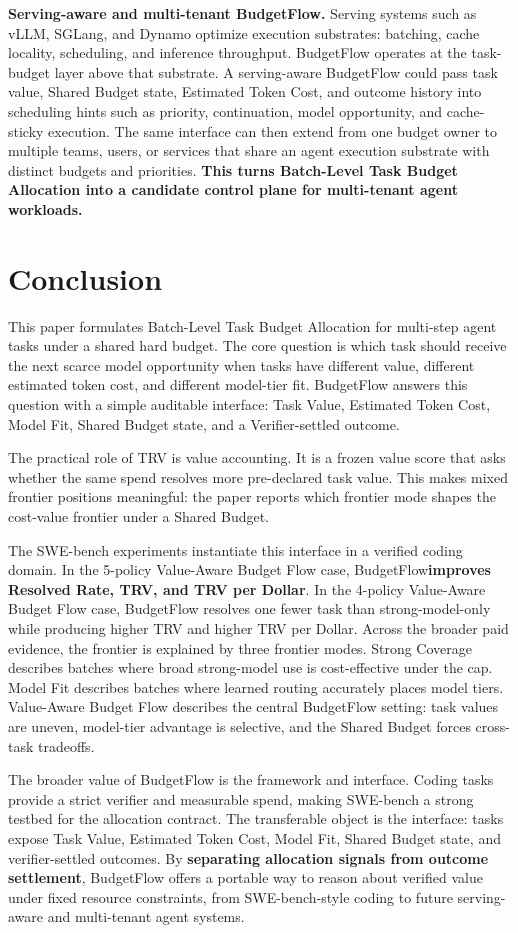 \documentclass{article}
\newcommand{\method}{BudgetFlow\xspace}
\newcommand{\trv}{TRV\xspace}
\newcommand{\taskvalue}{Task Value\xspace}
\newcommand{\tokencost}{Estimated Token Cost\xspace}
\newcommand{\modelfit}{Model Fit\xspace}
\newcommand{\sharedbudget}{Shared Budget\xspace}
\newcommand{\verifier}{Verifier\xspace}
\begin{document}
\textbf{Serving-aware and multi-tenant BudgetFlow.} Serving systems such as vLLM, SGLang, and Dynamo optimize execution substrates: batching, cache locality, scheduling, and inference throughput. \method operates at the task-budget layer above that substrate. A serving-aware BudgetFlow could pass task value, \sharedbudget state, \tokencost, and outcome history into scheduling hints such as priority, continuation, model opportunity, and cache-sticky execution. The same interface can then extend from one budget owner to multiple teams, users, or services that share an agent execution substrate with distinct budgets and priorities. \textbf{This turns Batch-Level Task Budget Allocation into a candidate control plane for multi-tenant agent workloads.}

\section{Conclusion}
This paper formulates Batch-Level Task Budget Allocation for multi-step agent tasks under a shared hard budget. The core question is which task should receive the next scarce model opportunity when tasks have different value, different estimated token cost, and different model-tier fit. \method answers this question with a simple auditable interface: \taskvalue, \tokencost, \modelfit, \sharedbudget state, and a \verifier-settled outcome.

The practical role of \trv is value accounting. It is a frozen value score that asks whether the same spend resolves more pre-declared task value. This makes mixed frontier positions meaningful: the paper reports which frontier mode shapes the cost-value frontier under a \sharedbudget.

The SWE-bench experiments instantiate this interface in a verified coding domain. In the 5-policy Value-Aware Budget Flow case, \method \textbf{improves Resolved Rate, \trv, and \trv per Dollar}. In the 4-policy Value-Aware Budget Flow case, \method resolves one fewer task than strong-model-only while producing higher \trv and higher \trv per Dollar. Across the broader paid evidence, the frontier is explained by three frontier modes. Strong Coverage describes batches where broad strong-model use is cost-effective under the cap. Model Fit describes batches where learned routing accurately places model tiers. Value-Aware Budget Flow describes the central \method setting: task values are uneven, model-tier advantage is selective, and the \sharedbudget forces cross-task tradeoffs.

The broader value of \method is the framework and interface. Coding tasks provide a strict verifier and measurable spend, making SWE-bench a strong testbed for the allocation contract. The transferable object is the interface: tasks expose \taskvalue, \tokencost, \modelfit, \sharedbudget state, and verifier-settled outcomes. By \textbf{separating allocation signals from outcome settlement}, BudgetFlow offers a portable way to reason about verified value under fixed resource constraints, from SWE-bench-style coding to future serving-aware and multi-tenant agent systems.



\end{document}
